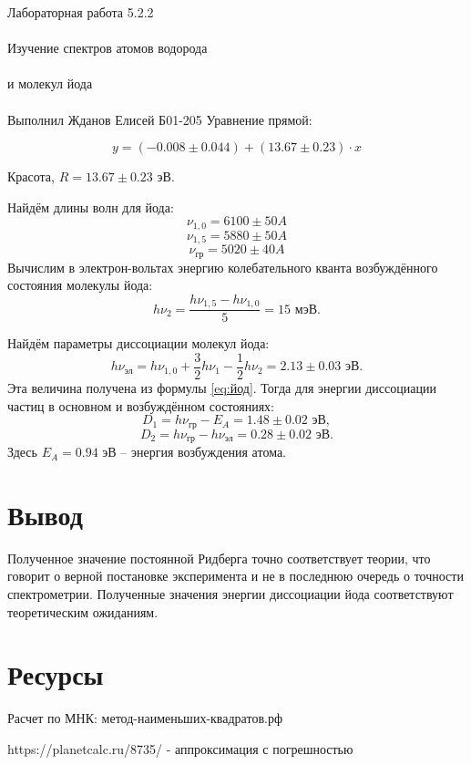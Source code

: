 \documentclass{astroedu-lab}
\begin{document}
\begin{problem}{\huge Лабораторная работа 5.2.2\\\\Изучение спектров атомов водорода\\\\и молекул йода\\\\Выполнил Жданов Елисей Б01-205}
Уравнение прямой:

\begin{equation}
	y = (-0.008 \pm 0.044) + (13.67 \pm 0.23) \cdot x
\end{equation}

\begin{center}
	Красота, $R = 13.67 \pm 0.23$ эВ.
\end{center}
	
\newpage	
	
	Найдём длины волн для йода:
	\[\nu_{1, 0} = 6100\pm 50 A\]
	\[\nu_{1, 5} = 5880\pm 50 A\]
	\[\nu_{гр} = 5020\pm 40 A\]
	Вычислим в электрон-вольтах энергию колебательного кванта возбуждённого состояния молекулы йода:
	\[h\nu_2 = \frac{h\nu_{1, 5} - h\nu_{1, 0}}{5} = 15 \text{ мэВ}.\]
	
	Найдём параметры диссоциации молекул йода:
	\[h\nu_{\text{эл}} = h\nu_{1, 0}+\dfrac{3}{2}h\nu_1 - \dfrac{1}{2}h\nu_2 = 2.13\pm 0.03 \text{ эВ}.\]
	Эта величина получена из формулы \eqref{eq:йод}. Тогда для энергии диссоциации частиц в основном и возбуждённом состояниях:
	\[D_1 = h\nu_{гр} - E_A = 1.48\pm 0.02\text{ эВ},\]
	\[D_2 = h\nu_{гр} - h\nu_{\text{эл}} = 0.28\pm 0.02\text{ эВ}.\]
	Здесь $ E_A = 0.94 \text{ эВ}$ -- энергия возбуждения атома.


\section{Вывод}

Полученное значение постоянной Ридберга точно соответствует теории, что говорит о верной постановке эксперимента и не в последнюю очередь о точности спектрометрии. Полученные значения энергии диссоциации йода соответствуют теоретическим ожиданиям.


\section{Ресурсы}

Расчет по МНК: метод-наименьших-квадратов.рф

https://planetcalc.ru/8735/ - аппроксимация с погрешностью


\end{problem}
\end{document}
